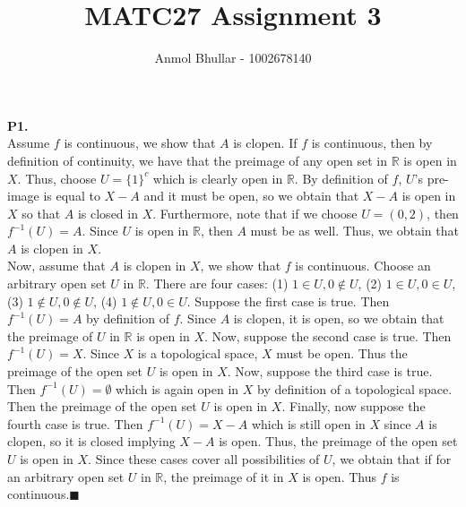 \documentclass{article}
\title{MATC27 Assignment 3}
\author{Anmol Bhullar - 1002678140}
\begin{document}
    \maketitle
    \textbf{P1.}\\ 
    Assume $f$ is continuous, we show that $A$ is clopen. If $f$ is continuous, then by definition of continuity, we have
    that the preimage of any open set in $\mathbb{R}$ is open in $X$. Thus, choose $U = \{1\}^{c}$ which is clearly open
    in $\mathbb{R}$. By definition of $f$, $U$'s pre-image is equal to $X-A$ and it must be open, so we obtain that
    $X-A$ is open in $X$ so that $A$ is closed in $X$. Furthermore, note that if we choose $U = (0,2)$, then $f^{-1}(U)
    = A$. Since $U$ is open in $\mathbb{R}$, then $A$ must be as well. Thus, we obtain that $A$ is clopen in $X$.\\
    Now, assume that $A$ is clopen in $X$, we show that $f$ is continuous. Choose an arbitrary open set $U$ in $\mathbb{R}$.
    There are four cases: (1) $1\in U,0\not\in U$, (2) $1\in U, 0\in U$, (3) $1\not\in U, 0\not\in U$, (4) $1\not\in U,0\in U$.
    Suppose the first case is true. Then $f^{-1}(U) = A$ by definition of $f$. Since $A$ is clopen, it is open, so we obtain 
    that the preimage of $U$
    in $\mathbb{R}$ is open in $X$. Now, suppose the second case is true. Then $f^{-1}(U) = X$. Since
    $X$ is a topological space, $X$ must be open. Thus the preimage of the open set $U$ is open in $X$.
    Now, suppose the third case is true.
    Then $f^{-1}(U) = \emptyset$ which is again open in $X$ by definition of a topological space. Then the preimage of the open set
    $U$ is open in $X$. Finally,
    now suppose the fourth case is true. Then $f^{-1}(U) = X-A$ which is still open in $X$ since $A$ is clopen, so it is closed
    implying $X-A$ is open. Thus, the preimage of the open set $U$ is open in $X$. 
    Since these cases cover all possibilities of $U$, we obtain that if for an
    arbitrary open set $U$ in $\mathbb{R}$, the preimage of it in $X$ is open. Thus $f$ is continuous.\hfill$\blacksquare$\\
\end{document}

